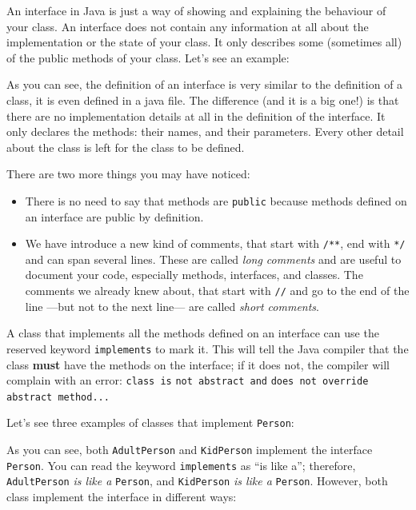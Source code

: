 An interface in Java is just a way of showing and explaining the
behaviour of your class. An interface does not contain any information
at all about the implementation or the state of your class. It only
describes some (sometimes all) of the public methods of your
class. Let's see an example: 


As you can see, the definition of an interface is very similar to the
definition of a class, it is even defined in a java file. 
The difference (and it is a big one!) is that
there are no implementation details at all in the definition of the
interface. It only declares the methods: their names, and their
parameters. Every other detail about the class is left for the class
to be defined. 

There are two more things you may have noticed: 

\begin{itemize}
\item There is no need to say that methods are \verb+public+
  because methods defined on an interface are public by definition.
\item We have introduce a new kind of comments, that start with
  \verb+/**+, end with \verb+*/+ and can span several lines. These
  are called \emph{long comments} and are useful to document your
  code, especially methods, interfaces, and classes. The comments we
  already knew about, that start with \verb+//+ and go to the end of
  the line ---but not to the next line--- are called \emph{short
    comments}. 
\end{itemize}

A class that implements all the methods defined on an interface can
use the reserved keyword \verb+implements+ to mark it. This will tell
the Java compiler that the class \textbf{must} have the methods on the
interface; if it does not, the compiler will complain with an error:
\verb+class is+ \verb+not abstract and+ \verb+does not override+
\verb+abstract method...+ 

Let's see three examples of classes that implement \verb+Person+:



As you can see, both \verb+AdultPerson+ and \verb+KidPerson+ implement
the interface \verb+Person+. You can read the keyword
\verb+implements+ as ``is like a''; therefore, \verb+AdultPerson+ 
\emph{is like a} \verb+Person+, and \verb+KidPerson+ \emph{is like a}
\verb+Person+. However, both class implement the interface in
different ways:  

